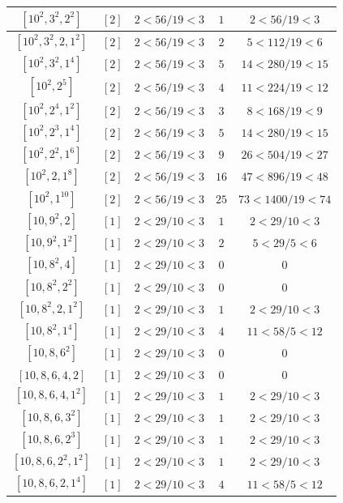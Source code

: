 \documentclass{article}%
\begin{document}
\begin{center}
\begin{longtable}{||c|c|c|c|c||}
$[10^{2}, 3^{2}, 2^{2}]$ & $[2]$ & $2 < 56/19 < 3$ & $1$ & $2 < 56/19 < 3$ \\ \hline 
$[10^{2}, 3^{2}, 2, 1^{2}]$ & $[2]$ & $2 < 56/19 < 3$ & $2$ & $5 < 112/19 < 6$ \\ \hline 
$[10^{2}, 3^{2}, 1^{4}]$ & $[2]$ & $2 < 56/19 < 3$ & $5$ & $14 < 280/19 < 15$ \\ \hline 
$[10^{2}, 2^{5}]$ & $[2]$ & $2 < 56/19 < 3$ & $4$ & $11 < 224/19 < 12$ \\ \hline 
$[10^{2}, 2^{4}, 1^{2}]$ & $[2]$ & $2 < 56/19 < 3$ & $3$ & $8 < 168/19 < 9$ \\ \hline 
$[10^{2}, 2^{3}, 1^{4}]$ & $[2]$ & $2 < 56/19 < 3$ & $5$ & $14 < 280/19 < 15$ \\ \hline 
$[10^{2}, 2^{2}, 1^{6}]$ & $[2]$ & $2 < 56/19 < 3$ & $9$ & $26 < 504/19 < 27$ \\ \hline 
$[10^{2}, 2, 1^{8}]$ & $[2]$ & $2 < 56/19 < 3$ & $16$ & $47 < 896/19 < 48$ \\ \hline 
$[10^{2}, 1^{10}]$ & $[2]$ & $2 < 56/19 < 3$ & $25$ & $73 < 1400/19 < 74$ \\ \hline 
$[10, 9^{2}, 2]$ & $[1]$ & $2 < 29/10 < 3$ & $1$ & $2 < 29/10 < 3$ \\ \hline 
$[10, 9^{2}, 1^{2}]$ & $[1]$ & $2 < 29/10 < 3$ & $2$ & $5 < 29/5 < 6$ \\ \hline 
$[10, 8^{2}, 4]$ & $[1]$ & $2 < 29/10 < 3$ & $0$ & $0$ \\ \hline 
$[10, 8^{2}, 2^{2}]$ & $[1]$ & $2 < 29/10 < 3$ & $0$ & $0$ \\ \hline 
$[10, 8^{2}, 2, 1^{2}]$ & $[1]$ & $2 < 29/10 < 3$ & $1$ & $2 < 29/10 < 3$ \\ \hline 
$[10, 8^{2}, 1^{4}]$ & $[1]$ & $2 < 29/10 < 3$ & $4$ & $11 < 58/5 < 12$ \\ \hline 
$[10, 8, 6^{2}]$ & $[1]$ & $2 < 29/10 < 3$ & $0$ & $0$ \\ \hline 
$[10, 8, 6, 4, 2]$ & $[1]$ & $2 < 29/10 < 3$ & $0$ & $0$ \\ \hline 
$[10, 8, 6, 4, 1^{2}]$ & $[1]$ & $2 < 29/10 < 3$ & $1$ & $2 < 29/10 < 3$ \\ \hline 
$[10, 8, 6, 3^{2}]$ & $[1]$ & $2 < 29/10 < 3$ & $1$ & $2 < 29/10 < 3$ \\ \hline 
$[10, 8, 6, 2^{3}]$ & $[1]$ & $2 < 29/10 < 3$ & $1$ & $2 < 29/10 < 3$ \\ \hline 
$[10, 8, 6, 2^{2}, 1^{2}]$ & $[1]$ & $2 < 29/10 < 3$ & $1$ & $2 < 29/10 < 3$ \\ \hline 
$[10, 8, 6, 2, 1^{4}]$ & $[1]$ & $2 < 29/10 < 3$ & $4$ & $11 < 58/5 < 12$ \\ \hline 

\end{longtable}
\end{center}
\end{document}
